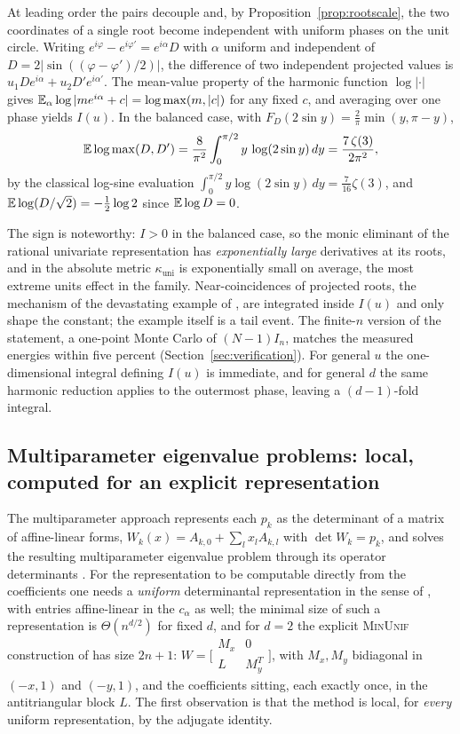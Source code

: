 \proof
At leading order the pairs decouple and, by Proposition~\ref{prop:rootscale}, the two
coordinates of a single root become independent with uniform phases on the unit circle.
Writing $e^{i\varphi} - e^{i\varphi'} = e^{i\alpha}D$ with $\alpha$ uniform and
independent of $D = 2|\sin((\varphi-\varphi')/2)|$, the difference of two independent
projected values is $u_1De^{i\alpha} + u_2D'e^{i\alpha'}$. The mean-value property of the
harmonic function $\log|\cdot|$ gives
$\mathbb{E}_\alpha\log|me^{i\alpha}+c| = \log\max(m,|c|)$ for any fixed $c$, and averaging over
one phase yields $I(u)$. In the balanced case, with $F_D(2\sin y) = \frac2\pi\min(y,\pi-y)$,
\[
  \mathbb{E}\log\max(D,D') = \frac8{\pi^2}\int_0^{\pi/2}y\,\log(2\sin y)\,dy
  = \frac{7\,\zeta(3)}{2\pi^2},
\]
by the classical log-sine evaluation
$\int_0^{\pi/2}y\log(2\sin y)\,dy = \frac7{16}\zeta(3)$, and
$\mathbb{E}\log(D/\sqrt2) = -\frac12\log2$ since $\mathbb{E}\log D = 0$.
\endproof

The sign is noteworthy: $I>0$ in the balanced case, so the monic eliminant of the rational
univariate representation has \emph{exponentially large} derivatives at its roots, and in
the absolute metric $\kappa_{\mathrm{uni}}$ is exponentially small on average, the most
extreme units effect in the family. Near-coincidences of projected roots, the mechanism of
the devastating example of \cite[Sec.~4]{graf2026numerical}, are integrated inside $I(u)$
and only shape the constant; the example itself is a tail event. The finite-$n$ version of
the statement, a one-point Monte Carlo of $(N-1)I_n$, matches the measured energies within
five percent (Section~\ref{sec:verification}). For general $u$ the one-dimensional
integral defining $I(u)$ is immediate, and for general $d$ the same harmonic reduction
applies to the outermost phase, leaving a $(d-1)$-fold integral.

\subsection{Multiparameter eigenvalue problems: local, computed for an explicit
  representation}\label{sec:mep}

The multiparameter approach represents each $p_k$ as the determinant of a matrix of
affine-linear forms, $W_k(x) = A_{k,0} + \sum_lx_lA_{k,l}$ with $\det W_k = p_k$, and
solves the resulting multiparameter eigenvalue problem through its operator determinants
\cite{graf2026numerical}. For the representation to be computable directly from the
coefficients one needs a \emph{uniform} determinantal representation in the sense of
\cite{boralevi2017uniform}, with entries affine-linear in the $c_\alpha$ as well; the
minimal size of such a representation is $\Theta(n^{d/2})$ for fixed $d$, and for $d=2$
the explicit \textsc{MinUnif} construction of \cite[Ex.~5.1]{boralevi2017uniform} has size
$2n+1$: $W = \bigl[\begin{smallmatrix}M_x&0\\L&M_y^T\end{smallmatrix}\bigr]$, with
$M_x,M_y$ bidiagonal in $(-x,1)$ and $(-y,1)$, and the coefficients sitting, each exactly
once, in the antitriangular block $L$. The first observation is that the method is local,
for \emph{every} uniform representation, by the adjugate identity.

